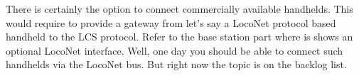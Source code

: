 There is certainly the option to connect commercially available handhelds. This would require to provide a gateway from let's say a LocoNet protocol based handheld to the LCS protocol. Refer to the base station part where is shows an optional LocoNet interface. Well, one day you should be able to connect such handhelds via the LocoNet bus. But right now the topic is on the backlog list.